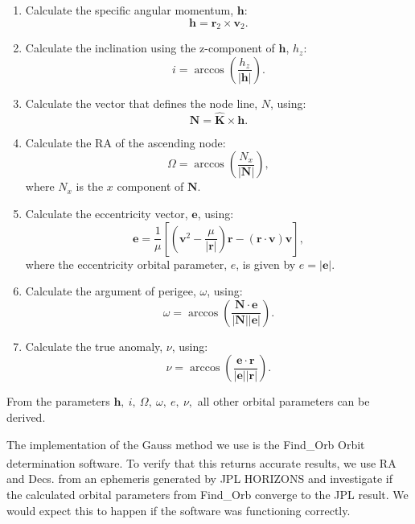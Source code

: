 \documentclass[10pt, twocolumn]{revtex4}    %
\newcommand{\scite}[1]{\textsuperscript{\cite{#1}}}
\begin{document}
\begin{enumerate}
 \item Calculate the specific angular momentum, $\mathbf{h}$:
 \begin{equation}
 \mathbf{h} = \mathbf{r}_2 \times \mathbf{v}_2 .
 \end{equation} 
 \item Calculate the inclination using the z-component of $\mathbf{h}$, $h_z$:
 \begin{equation}
 i = \arccos\left( \frac{h_z}{|\mathbf{h}|} \right) .
 \end{equation}
 \item Calculate the vector that defines the node line, $N$, using:
 \begin{equation}
 \mathbf{N} = \mathbf{\hat{K}} \times \mathbf{h} .
 \end{equation} 
 \item Calculate the RA of the ascending node:
 \begin{equation}
 \Omega = \arccos \left( \frac{N_x}{|\mathbf{N}|} \right) ,
 \end{equation}
 where $N_x$ is the $x$ component of $\mathbf{N}$.
 \item Calculate the eccentricity vector, $\mathbf{e}$, using:
 \begin{equation}
 \mathbf{e} = \frac{1}{\mu} \left[ \left(\mathbf{v}^2 - \frac{\mu}{|\mathbf{r}|} \right) \mathbf{r} - (\mathbf{r}\cdot\mathbf{v}) \mathbf{v} \right] ,
 \end{equation}
 where the eccentricity orbital parameter, $e$, is given by $e = |\mathbf{e}|$.
 \item Calculate the argument of perigee, $\omega$, using:
 \begin{equation}
 \omega = \arccos \left( \frac{\mathbf{N} \cdot \mathbf{e}}{|\mathbf{N}||\mathbf{e}|} \right) .
 \end{equation}
 \item Calculate the true anomaly, $\nu$, using:
 \begin{equation}
 \nu = \arccos \left( \frac{\mathbf{e} \cdot \mathbf{r}}{|\mathbf{e}||\mathbf{r}|} \right) .
 \end{equation}
\end{enumerate}
From the parameters $\mathbf{h},\ i,\ \Omega,\ \omega,\ e,\ \nu,$ all other orbital parameters can be derived.
\vspace{1ex}

The implementation of the Gauss method we use is the Find\_Orb Orbit determination software.\scite{FindOrbOrbit} To verify that this returns accurate results, we use RA and Decs. from an ephemeris generated by JPL HORIZONS and investigate if the calculated orbital parameters from Find\_Orb converge to the JPL result. We would expect this to happen if the software was functioning correctly. 
\end{document}
